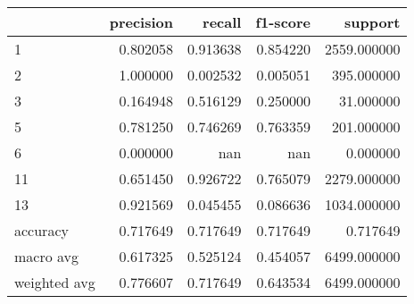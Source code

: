 \begin{tabular}{lrrrr}
\toprule
 & precision & recall & f1-score & support \\
\midrule
1 & 0.802058 & 0.913638 & 0.854220 & 2559.000000 \\
2 & 1.000000 & 0.002532 & 0.005051 & 395.000000 \\
3 & 0.164948 & 0.516129 & 0.250000 & 31.000000 \\
5 & 0.781250 & 0.746269 & 0.763359 & 201.000000 \\
6 & 0.000000 & nan & nan & 0.000000 \\
11 & 0.651450 & 0.926722 & 0.765079 & 2279.000000 \\
13 & 0.921569 & 0.045455 & 0.086636 & 1034.000000 \\
accuracy & 0.717649 & 0.717649 & 0.717649 & 0.717649 \\
macro avg & 0.617325 & 0.525124 & 0.454057 & 6499.000000 \\
weighted avg & 0.776607 & 0.717649 & 0.643534 & 6499.000000 \\
\bottomrule
\end{tabular}
